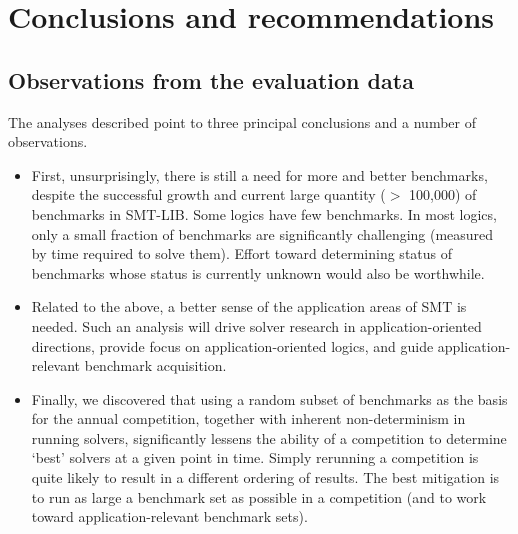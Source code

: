 \documentclass{eptcs}
\begin{document}
\section{Conclusions and recommendations}
\label{Conclusions}

\subsection{Observations from the evaluation data}

The analyses described point to three principal conclusions and a number of observations.
\begin{itemize}
\item First, unsurprisingly, there is still a need for more and better benchmarks, despite the successful growth and current large quantity ($>$ 100,000) of benchmarks in SMT-LIB. Some logics have few benchmarks. In most logics, only a small fraction of benchmarks are significantly challenging (measured by time required to solve them).
Effort toward determining status of benchmarks whose status is currently unknown would also be worthwhile.
\item Related to the above, a better sense of the application areas of SMT is needed. Such an analysis will drive solver research in application-oriented directions, provide focus on application-oriented logics, and guide application-relevant benchmark acquisition.
\item Finally, we discovered that using a random subset of benchmarks as the basis for the annual competition, together with inherent non-determinism in running solvers, significantly lessens the ability of a competition to determine `best' solvers at a given point in time. Simply rerunning a competition is quite likely to result in a different ordering of results. The best mitigation is to run as large a benchmark set as possible in a competition (and to work toward application-relevant benchmark sets).
\end{itemize}
\end{document}
